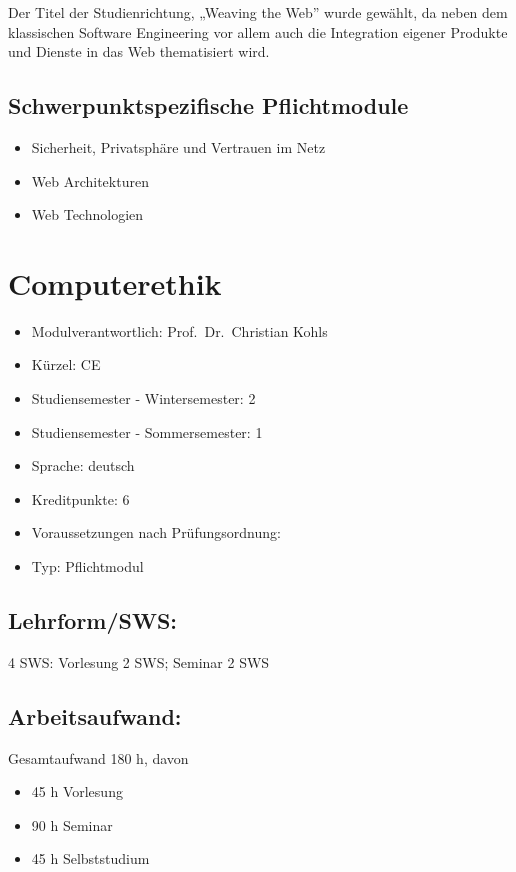 Der Titel der Studienrichtung, „Weaving the Web'' wurde gewählt, da
neben dem klassischen Software Engineering vor allem auch die
Integration eigener Produkte und Dienste in das Web thematisiert wird.

\section*{Schwerpunktspezifische
Pflichtmodule}\label{schwerpunktspezifische-pflichtmodule-4}

\begin{itemize}
\tightlist
\item
  Sicherheit, Privatsphäre und Vertrauen im Netz
\item
  Web Architekturen
\item
  Web Technologien
\end{itemize}

\chapter{Computerethik}\label{computerethik}

\begin{itemize}
\tightlist
\item
  Modulverantwortlich: Prof.~Dr.~Christian Kohls
\item
  Kürzel: CE
\item
  Studiensemester - Wintersemester: 2
\item
  Studiensemester - Sommersemester: 1
\item
  Sprache: deutsch
\item
  Kreditpunkte: 6
\item
  Voraussetzungen nach Prüfungsordnung:
\item
  Typ: Pflichtmodul
\end{itemize}

\section*{Lehrform/SWS:}\label{lehrformsws}

4 SWS: Vorlesung 2 SWS; Seminar 2 SWS

\section*{Arbeitsaufwand:}\label{arbeitsaufwand}

Gesamtaufwand 180 h, davon

\begin{itemize}
\tightlist
\item
  45 h Vorlesung
\item
  90 h Seminar
\item
  45 h Selbststudium
\end{itemize}

